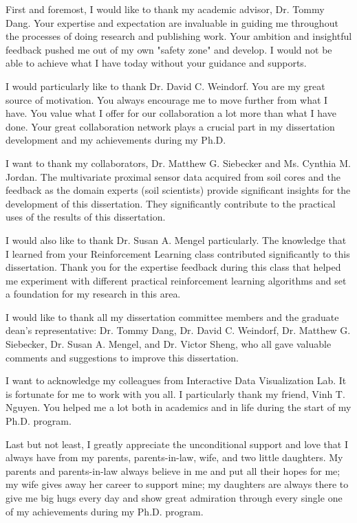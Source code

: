 
First and foremost, I would like to thank my academic advisor, Dr. Tommy Dang. Your expertise and expectation are invaluable in guiding me throughout the processes of doing research and publishing work. Your ambition and insightful feedback pushed me out of my own "safety zone" and develop. I would not be able to achieve what I have today without your guidance and supports.

I would particularly like to thank Dr. David C. Weindorf. You are my great source of motivation. You always encourage me to move further from what I have. You value what I offer for our collaboration a lot more than what I have done. Your great collaboration network plays a crucial part in my dissertation development and my achievements during my Ph.D.

I want to thank my collaborators, Dr. Matthew G. Siebecker and Ms. Cynthia M. Jordan. The multivariate proximal sensor data acquired from soil cores and the feedback as the domain experts (soil scientists) provide significant insights for the development of this dissertation. They significantly contribute to the practical uses of the results of this dissertation.

I would also like to thank Dr. Susan A. Mengel particularly. The knowledge that I learned from your Reinforcement Learning class contributed significantly to this dissertation. Thank you for the expertise feedback during this class that helped me experiment with different practical reinforcement learning algorithms and set a foundation for my research in this area.


I would like to thank all my dissertation committee members and the graduate dean's representative: Dr. Tommy Dang, Dr. David C. Weindorf, Dr. Matthew G. Siebecker, Dr. Susan A. Mengel, and Dr. Victor Sheng, who all gave valuable comments and suggestions to improve this dissertation. 

I want to acknowledge my colleagues from Interactive Data Visualization Lab. It is fortunate for me to work with you all. I particularly thank my friend, Vinh T. Nguyen. You helped me a lot both in academics and in life during the start of my Ph.D. program.

Last but not least, I greatly appreciate the unconditional support and love that I always have from my parents, parents-in-law, wife, and two little daughters. My parents and parents-in-law always believe in me and put all their hopes for me; my wife gives away her career to support mine; my daughters are always there to give me big hugs every day and show great admiration through every single one of my achievements during my Ph.D. program.